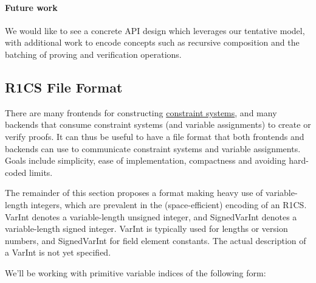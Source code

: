 \paragraph[:]{Future work} 
We would like to see a concrete API design which leverages our tentative model, with additional work to encode concepts such as recursive composition and the batching of proving and verification operations.


\subsection{R1CS File Format}
\label{implem:apis-and-file-formats:R1CS-file-format}

There are many frontends for constructing \hyperref[security:spec-statements-ZK]{constraint systems}, and many backends that consume constraint systems (and variable assignments) to create or verify proofs.
It can thus be useful to have a file format \cite{zkproof-file-formats} that both frontends and backends can use to communicate constraint systems and variable assignments.
Goals include simplicity, ease of implementation, compactness and avoiding hard-coded limits.




The remainder of this section proposes a format making heavy use of variable-length integers, which are prevalent in the (space-efficient) encoding of an R1CS. VarInt denotes a variable-length unsigned integer, and SignedVarInt denotes a variable-length signed integer. 
VarInt is typically used for lengths or version numbers, and SignedVarInt for field element constants. 
The actual description of a VarInt is not yet specified.
\loosen


We'll be working with primitive variable indices of the following form:


